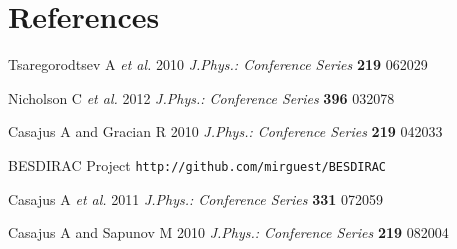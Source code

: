 \section*{References}
\begin{thebibliography}{9}
        Tsaregorodtsev A {\it et al.}
        2010 {\it J.Phys.: Conference Series}
        {\bf 219} 062029

        Nicholson C {\it et al.}
        2012 {\it J.Phys.: Conference Series}
        {\bf 396} 032078

        Casajus A and Gracian R
        2010 {\it J.Phys.: Conference Series}
        {\bf 219} 042033

        BESDIRAC Project
        \verb"http://github.com/mirguest/BESDIRAC"

        Casajus A {\it et al.}
        2011 {\it J.Phys.: Conference Series}
        {\bf 331} 072059

        Casajus A and Sapunov M
        2010 {\it J.Phys.: Conference Series}
        {\bf 219} 082004
\end{thebibliography}
